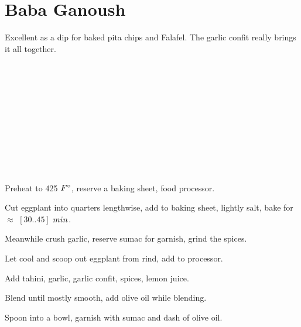 \section[Baba Ganoush]{Baba Ganoush}

\begin{recipestats}[
        servings=4,
        preptime=15~\minute,
        bakingtime=60~\minute,
        source=Mike \& Jane,
    ]
\end{recipestats}

\begin{recipeabstract}
    Excellent as a dip for baked pita chips and Falafel.
    The garlic confit really brings it all together.
\end{recipeabstract}

\begin{ingredientcolumns}
    \begin{ingredientblock}
        \\
        \\
        \\
        \\
        \\
    \end{ingredientblock}
    \begin{ingredientblock}
        \\
        \\
        \\
        \\
    \end{ingredientblock}
\end{ingredientcolumns}

\begin{preparation}
\item Preheat to 425 $\Fahrenheit$, reserve a baking sheet, food processor.
\item Cut eggplant into quarters lengthwise, add to baking sheet, lightly salt, bake for $\approx$ $[30..45]$ $\minute$.
\item Meanwhile crush garlic, reserve sumac for garnish, grind the spices.
\item Let cool and scoop out eggplant from rind, add to processor.
\item Add tahini, garlic, garlic confit, spices, lemon juice.
\item Blend until mostly smooth, add olive oil while blending.
\item Spoon into a bowl, garnish with sumac and dash of olive oil.
\end{preparation}

\recipeend%
